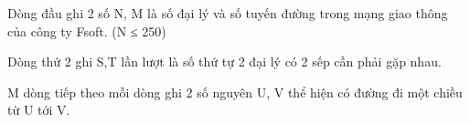 Dòng đầu ghi 2 số N, M là số đại lý và số tuyến đường trong mạng giao thông của công ty Fsoft. (N ≤ 250)

Dòng thứ 2 ghi S,T lần lượt là số thứ tự 2 đại lý có 2 sếp cần phải gặp nhau.

M dòng tiếp theo mỗi dòng ghi 2 số nguyên U, V thể hiện có đường đi một chiều từ U tới V.